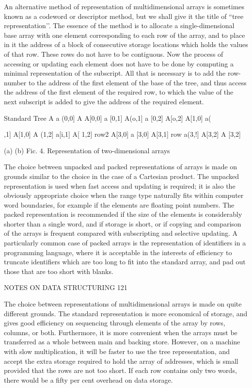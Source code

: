 {{{{				An alternative method of representation of multidimensional arrays is sometimes known as a codeword or descriptor method, but we shall give it the title of “tree representation’’. The essence of the method is to allocate a single-dimensional base array with one element corresponding to each row of the array, and to place in it the address of a block of consecutive storage locations which holds the values of that row. These rows do not have to be contiguous. Now the process of accessing or updating each element does not have to be done by computing a minimal representation of the subscript. All that is necessary is to add the row-number to the address of the first element of the base of the tree, and thus access the address of the first element of the required row, to which the value of the next subscript is added to give the address of the required element.
				
				Standard Tree A a (0,0] A A[0,0] a [0,1] A(o,1] a [0,2] A[o,2] A[1,0] a(},1] A[1,0] A (1,2] a[i,1] A[ 1,2] row2 A[3,0] a [3,0] A[3,1] row a(3,!] A[3,2] A [3,2]
			
			(a) (b) Fic. 4. Representation of two-dimensional arrays
			
			The choice between unpacked and packed representations of arrays is made on grounds similar to the choice in the case of a Cartesian product. The unpacked representation is used when fast access and updating is required; it is also the obviously appropriate choice when the range type naturally fits within computer word boundaries, for example if the elements are floating point numbers. The packed representation is recommended if the size of the elements is considerably shorter than a single word, and if storage is short, or if copying and comparison of the arrays is frequent compared with subscripting and selective updating. A particularly common case of packed arrays is the representation of identifiers in a programming language, where it is acceptable in the interests of efficiency to truncate identifiers which are too long to fit into the standard array, and pad out those that are too short with blanks.
			
			NOTES ON DATA STRUCTURING 121
			
			The choice between representations of multidimensional arrays is made on quite different grounds. The standard representation is more economical of storage, and gives good efficiency on sequencing through elements of the array by rows, columns, or both. Furthermore, it is more convenient when the arrays must be transferred as a whole between main and backing store. However, on a machine with slow multiplication, it will be faster to use the tree representation, and accept the extra storage required to hold the array of addresses, which is small provided that the rows are not too short. If each row contains only two words, there would be a fifty per cent overhead on data storage.
			
}}}
